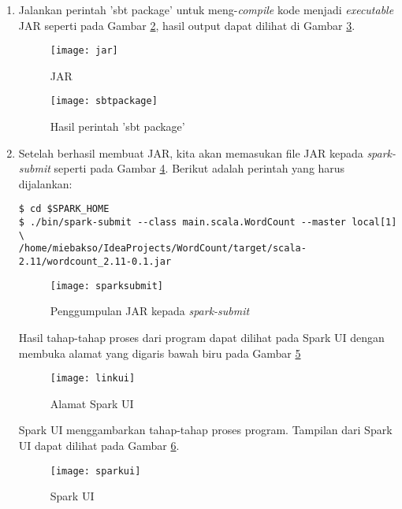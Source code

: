 \begin{enumerate}
Setelah itu, tambahkan kode berikut seperti pada Gambar \ref{fig:kodeword}.

\begin{figure}[H]
    \centering  
    \texttt{[image: kodeword]}  
    \caption[Kode WordCount]{Kode WordCount} 
    \label{fig:kodeword} 
\end{figure}

\item Jalankan perintah 'sbt package' untuk meng-\textit{compile} kode menjadi \textit{executable} JAR seperti pada Gambar \ref{fig:jar}, hasil output dapat dilihat di Gambar \ref{fig:sbtpackage}.

\begin{figure}[H]
    \centering  
    \texttt{[image: jar]}  
    \caption[JAR]{JAR} 
    \label{fig:jar} 
\end{figure}

\begin{figure}[H]
    \centering  
    \texttt{[image: sbtpackage]}  
    \caption[Hasil perintah 'sbt package']{Hasil perintah 'sbt package'} 
    \label{fig:sbtpackage} 
\end{figure}

\item Setelah berhasil membuat JAR, kita akan memasukan file JAR kepada \textit{spark-submit} seperti pada Gambar \ref{fig:sparksubmit}. Berikut adalah perintah yang harus dijalankan: 

\begin{verbatim}
$ cd $SPARK_HOME
$ ./bin/spark-submit --class main.scala.WordCount --master local[1] \
/home/miebakso/IdeaProjects/WordCount/target/scala-2.11/wordcount_2.11-0.1.jar 
\end{verbatim}

\begin{figure}[H]
    \centering  
    \texttt{[image: sparksubmit]}  
    \caption[Penggumpulan JAR kepada \textit{spark-submit}]{Penggumpulan JAR kepada \textit{spark-submit}} 
    \label{fig:sparksubmit} 
\end{figure}

Hasil tahap-tahap proses dari program dapat dilihat pada Spark UI dengan membuka alamat yang digaris bawah biru pada Gambar \ref{fig:linkui}

\begin{figure}[H]
    \centering  
    \texttt{[image: linkui]}  
    \caption[Alamat Spark UI]{Alamat Spark UI} 
    \label{fig:linkui} 
\end{figure}

Spark UI menggambarkan tahap-tahap proses program. Tampilan dari Spark UI dapat dilihat pada Gambar \ref{fig:sparkui}.
\begin{figure}[H]
    \centering  
    \texttt{[image: sparkui]}  
    \caption[Spark UI]{Spark UI} 
    \label{fig:sparkui} 
\end{figure}





 
\end{enumerate}
